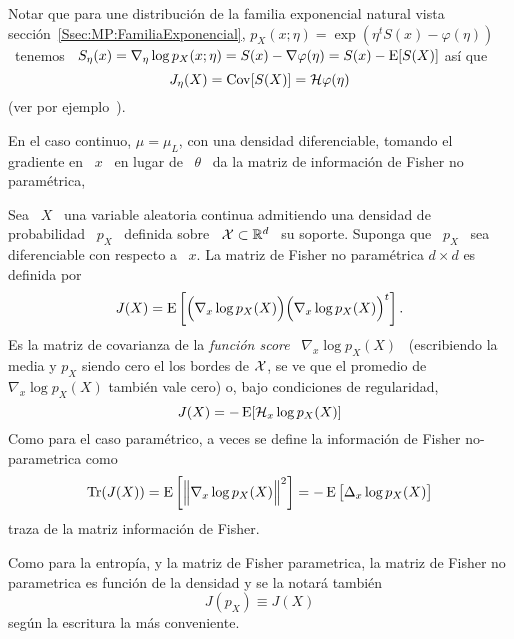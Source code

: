 Notar  que para  une  distribuci\'on  de la  familia  exponencial natural  vista
secci\'on~\ref{Ssec:MP:FamiliaExponencial},  $p_X(x;\eta)  =  \exp\left(  \eta^t
  S(x)  - \varphi(\eta)  \right)$  \  tenemos \  $S_\eta(x)  = \nabla_\eta  \log
p_X(x;\eta) = S(x) - \nabla \varphi(\eta) = S(x) - \operatorname{E}[S(X)]$ as\'i que
%
\[
J_\eta(X) = \operatorname{Cov}[S(X)] = \mathcal{H} \varphi(\eta)
\]
%
(ver por ejemplo~\cite{LehCas98, Bos07}).

En el caso  continuo, $\mu = \mu_L$, con una  densidad diferenciable, tomando el
gradiente en \ $x$  \ en lugar de \ $\theta$ \ da  la matriz de informaci\'on de
Fisher no param\'etrica,
%
\begin{definicion}
\label{Def:SZ:MatrizFisherNoParametrica}
%
  Sea  \ $X$  \  una  variable aleatoria  continua  admitiendo  una densidad  de
  probabilidad \  $p_X$ \ definida  sobre \ $\mathcal{X}  \subset \mathbb{R}^d$ \  su soporte.
  Suponga que \  $p_X$ \ sea diferenciable  con respecto a \ $x$.   La matriz de
  Fisher no param\'etrica $d \times d$ es definida por
  \[
  J(X) =  \operatorname{E}\left[ \Big(  \nabla_x \log p_X(X)  \Big) \Big(  \nabla_x \log
      p_X(X) \Big)^t \right].
  \]
  Es  la matriz  de covarianza  de  la {\it  funci\'on score}  \ $\nabla_x  \log
  p_X(X)$ \ (escribiendo la media y $p_X$  siendo cero el los bordes de $\mathcal{X}$, se
  ve que  el promedio  de $\nabla_x  \log p_X(X)$ tambi\'en  vale cero)  o, bajo
  condiciones de regularidad,
  \[
  J(X) = - \operatorname{E}[\mathcal{H}_x \log p_X(X)]
  \]
  Como para el caso param\'etrico, a  veces se define la informaci\'on de Fisher
  no-parametrica como
  \[  
  \operatorname{Tr}(J(X))  =  \operatorname{E}\left[  \Big\|  \nabla_x  \log  p_X(X)  \Big\|^2  \right]  =
  - \operatorname{E}\big[ \Delta_x \log p_X(X) \big] \]
  traza de  la matriz  informaci\'on de Fisher.
\end{definicion}
%
Como para la entrop\'ia, y la matriz  de Fisher parametrica, la matriz de Fisher
no parametrica es funci\'on de la densidad y se la notar\'a tambi\'en
%
\[
J(p_X) \equiv J(X)
\]
%
seg\'un la escritura la m\'as conveniente.

